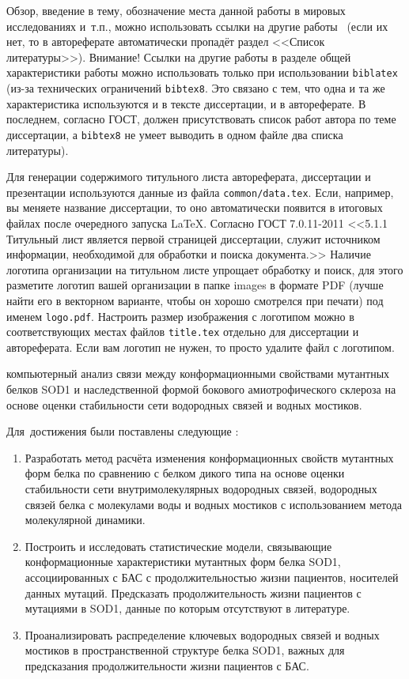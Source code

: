 
{\actuality} Обзор, введение в тему, обозначение места данной работы в
мировых исследованиях и~т.\:п., можно использовать ссылки на другие
работы~\cite{Gosele1999161} (если их нет, то в автореферате
автоматически пропадёт раздел <<Список литературы>>). Внимание! Ссылки
на другие работы в разделе общей характеристики работы можно
использовать только при использовании \verb!biblatex! (из-за технических
ограничений \verb!bibtex8!. Это связано с тем, что одна и та же
характеристика используются и в тексте диссертации, и в
автореферате. В последнем, согласно ГОСТ, должен присутствовать список
работ автора по теме диссертации, а \verb!bibtex8! не умеет выводить в одном
файле два списка литературы).

Для генерации содержимого титульного листа автореферата, диссертации и
презентации используются данные из файла \verb!common/data.tex!. Если,
например, вы меняете название диссертации, то оно автоматически
появится в итоговых файлах после очередного запуска \LaTeX. Согласно
ГОСТ 7.0.11-2011 <<5.1.1 Титульный лист является первой страницей
диссертации, служит источником информации, необходимой для обработки и
поиска документа.>> Наличие логотипа организации на титульном листе
упрощает обработку и поиск, для этого разметите логотип вашей
организации в папке images в формате PDF (лучше найти его в векторном
варианте, чтобы он хорошо смотрелся при печати) под именем
\verb!logo.pdf!. Настроить размер изображения с логотипом можно в
соответствующих местах файлов \verb!title.tex!  отдельно для
диссертации и автореферата. Если вам логотип не нужен, то просто
удалите файл с логотипом.


{\aim} компьютерный анализ связи между конформационными свойствами мутантных белков SOD1 и наследственной формой бокового амиотрофического склероза на основе оценки стабильности сети водородных связей и водных мостиков.

Для~достижения были поставлены следующие {\tasks}:
\begin{enumerate}
  \item Разработать метод расчёта изменения конформационных свойств мутантных форм белка по сравнению с белком дикого типа на основе оценки стабильности сети внутримолекулярных водородных связей, водородных связей белка с молекулами воды и водных мостиков с использованием метода молекулярной динамики.
  \item Построить и исследовать статистические модели, связывающие конформационные характеристики мутантных форм белка SOD1, ассоциированных с БАС с продолжительностью жизни пациентов, носителей данных мутаций. Предсказать продолжительность жизни пациентов с мутациями в SOD1, данные по которым отсутствуют в литературе.
  \item Проанализировать распределение ключевых водородных связей и водных мостиков в пространственной структуре белка SOD1, важных для предсказания продолжительности жизни пациентов с БАС.
\end{enumerate}


